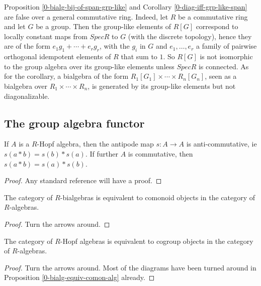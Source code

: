 Proposition \ref{0-bialg-bij-of-span-grp-like} and Corollary \ref{0-diag-iff-grp-like-span} are false over a general commutative ring.
Indeed, let $R$ be a commutative ring and let $G$ be a group.
Then the group-like elements of $R[G]$ correspond to locally constant maps from $Spec R$ to $G$ (with the discrete topology),
hence they are of the form $e_1 g_1+\cdots+e_r g_r$, with the $g_i$ in $G$ and $e_1,\ldots,e_r$ a family of pairwise orthogonal idempotent elements of $R$ that sum to $1$.
So $R[G]$ is not isomorphic to the group algebra over its group-like elements unless $Spec R$ is connected.
As for the corollary, a bialgebra of the form $R_1[G_1]\times\cdots\times R_n[G_n]$,
seen as a bialgebra over $R_1\times\cdots\times R_n$,
is generated by its group-like elements but not diagonalizable.


\subsection{The group algebra functor}


\begin{proposition}
  \label{0-antipode-mul}
  \leanok

  If $A$ is a $R$-Hopf algebra, then the antipode map $s : A \to A$ is anti-commutative, ie $s(a * b) = s(b) * s(a)$. If further $A$ is commutative, then $s(a * b) = s(a) * s(b)$.
\end{proposition}
\begin{proof}
  \leanok

  Any standard reference will have a proof.
\end{proof}


\begin{proposition}
  \label{0-bialg-equiv-comon-alg}
  \leanok

  The category of $R$-bialgebras is equivalent to comonoid objects in the category of $R$-algebras.
\end{proposition}
\begin{proof}
  \leanok

  Turn the arrows around.
\end{proof}


\begin{proposition}
  \label{0-hopf-alg-equiv-cogrp-alg}
  \leanok

  The category of $R$-Hopf algebras is equivalent to cogroup objects in the category of $R$-algebras.
\end{proposition}
\begin{proof}
  \leanok

  Turn the arrows around.
  Most of the diagrams have been turned around in Proposition \ref{0-bialg-equiv-comon-alg} already.
\end{proof}


